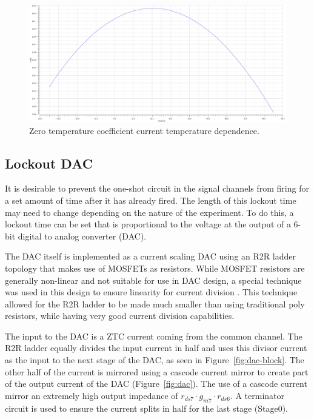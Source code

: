 \documentclass[12pt,oneside,final]{siuethesis}
\theoremstyle{definition}
\begin{document}
\begin{figure}[htbp!]
\centering
\includegraphics[scale=.3,keepaspectratio=true]{../data/ztc.png} 
\caption{Zero temperature coefficient current temperature dependence.}
\label{fig:ztc-temp}
\end{figure}

\subsection{Lockout DAC}
\par It is desirable to prevent the one-shot circuit in the signal channels from firing for a set amount of time after it has already fired. The length of this lockout time may need to change depending on the nature of the experiment. To do this, a lockout time can be set that is proportional to the voltage at the output of a 6-bit digital to analog converter (DAC). 
\par The DAC itself is implemented as a current scaling DAC using an R2R ladder topology that makes use of MOSFETs as resistors. While MOSFET resistors are generally non-linear and not suitable for use in DAC design, a special technique was used in this design to ensure linearity for current division \cite{DAC}. This technique allowed for the R2R ladder to be made much smaller than using traditional poly resistors, while having very good current division capabilities.
\par The input to the DAC is a ZTC current coming from the common channel. The R2R ladder equally divides the input current in half and uses this divisor current as the input to the next stage of the DAC, as seen in Figure~\ref{fig:dac-block}. The other half of the current is mirrored using a cascode current mirror to create part of the output current of the DAC (Figure~\ref{fig:dac}). The use of a cascode current mirror an extremely high output impedance of $r_{ds7}\cdot g_{m7} \cdot r_{ds6}$. A terminator circuit is used to ensure the current splits in half for the last stage (Stage0).
\end{document}

